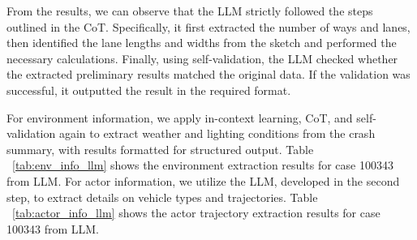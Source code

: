 From the results, we can observe that the LLM strictly followed the steps outlined in the CoT. Specifically, it first extracted the number of ways and lanes, then identified the lane lengths and widths from the sketch and performed the necessary calculations. Finally, using self-validation, the LLM checked whether the extracted preliminary results matched the original data. If the validation was successful, it outputted the result in the required format.

\begin{table}[h!]
\centering
{}
\caption{Environment Info Extraction Results - 100343}
\label{tab:env_info_llm}
\end{table}

For environment information, we apply in-context learning, CoT, and self-validation again to extract weather and lighting conditions from the crash summary, with results formatted for structured output. Table ~\ref{tab:env_info_llm} shows the environment extraction results for case 100343 from LLM. For actor information, we utilize the {\tooltwo} LLM, developed in the second step, to extract details on vehicle types and trajectories. Table ~\ref{tab:actor_info_llm} shows the actor trajectory extraction results for case 100343 from LLM.




